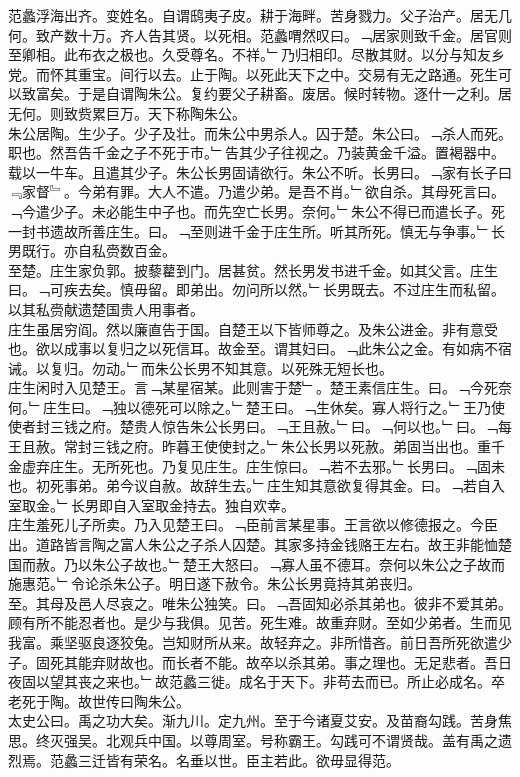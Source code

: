 \documentclass{zhvt-classic}
\begin{document}
\hspace*{2em}范蠡浮海出齐。变姓名。自谓鸱夷子皮。耕于海畔。苦身戮力。父子治产。居无几何。致产数十万。齐人告其贤。以死相。范蠡喟然叹曰。﹁居家则致千金。居官则至卿相。此布衣之极也。久受尊名。不祥。﹂乃归相印。尽散其财。以分与知友乡党。而怀其重宝。间行以去。止于陶。以死此天下之中。交易有无之路通。死生可以致富矣。于是自谓陶朱公。复约要父子耕畜。废居。候时转物。逐什一之利。居无何。则致赀累巨万。天下称陶朱公。\\
\hspace*{2em}朱公居陶。生少子。少子及壮。而朱公中男杀人。囚于楚。朱公曰。﹁杀人而死。职也。然吾告千金之子不死于市。﹂告其少子往视之。乃装黄金千溢。置褐器中。载以一牛车。且遣其少子。朱公长男固请欲行。朱公不听。长男曰。﹁家有长子曰﹃家督﹄。今弟有罪。大人不遣。乃遣少弟。是吾不肖。﹂欲自杀。其母死言曰。﹁今遣少子。未必能生中子也。而先空亡长男。奈何。﹂朱公不得已而遣长子。死一封书遗故所善庄生。曰。﹁至则进千金于庄生所。听其所死。慎无与争事。﹂长男既行。亦自私赍数百金。\\
\hspace*{2em}至楚。庄生家负郭。披藜藋到门。居甚贫。然长男发书进千金。如其父言。庄生曰。﹁可疾去矣。慎毋留。即弟出。勿问所以然。﹂长男既去。不过庄生而私留。以其私赍献遗楚国贵人用事者。\\
\hspace*{2em}庄生虽居穷阎。然以廉直告于国。自楚王以下皆师尊之。及朱公进金。非有意受也。欲以成事以复归之以死信耳。故金至。谓其妇曰。﹁此朱公之金。有如病不宿诫。以复归。勿动。﹂而朱公长男不知其意。以死殊无短长也。\\
\hspace*{2em}庄生闲时入见楚王。言﹁某星宿某。此则害于楚﹂。楚王素信庄生。曰。﹁今死奈何。﹂庄生曰。﹁独以德死可以除之。﹂楚王曰。﹁生休矣。寡人将行之。﹂王乃使使者封三钱之府。楚贵人惊告朱公长男曰。﹁王且赦。﹂曰。﹁何以也。﹂曰。﹁每王且赦。常封三钱之府。昨暮王使使封之。﹂朱公长男以死赦。弟固当出也。重千金虚弃庄生。无所死也。乃复见庄生。庄生惊曰。﹁若不去邪。﹂长男曰。﹁固未也。初死事弟。弟今议自赦。故辞生去。﹂庄生知其意欲复得其金。曰。﹁若自入室取金。﹂长男即自入室取金持去。独自欢幸。\\
\hspace*{2em}庄生羞死儿子所卖。乃入见楚王曰。﹁臣前言某星事。王言欲以修德报之。今臣出。道路皆言陶之富人朱公之子杀人囚楚。其家多持金钱赂王左右。故王非能恤楚国而赦。乃以朱公子故也。﹂楚王大怒曰。﹁寡人虽不德耳。奈何以朱公之子故而施惠范。﹂令论杀朱公子。明日遂下赦令。朱公长男竟持其弟丧归。\\
\hspace*{2em}至。其母及邑人尽哀之。唯朱公独笑。曰。﹁吾固知必杀其弟也。彼非不爱其弟。顾有所不能忍者也。是少与我俱。见苦。死生难。故重弃财。至如少弟者。生而见我富。乘坚驱良逐狡兔。岂知财所从来。故轻弃之。非所惜吝。前日吾所死欲遣少子。固死其能弃财故也。而长者不能。故卒以杀其弟。事之理也。无足悲者。吾日夜固以望其丧之来也。﹂故范蠡三徙。成名于天下。非苟去而已。所止必成名。卒老死于陶。故世传曰陶朱公。\\
\hspace*{2em}太史公曰。禹之功大矣。渐九川。定九州。至于今诸夏艾安。及苗裔勾践。苦身焦思。终灭强吴。北观兵中国。以尊周室。号称霸王。勾践可不谓贤哉。盖有禹之遗烈焉。范蠡三迁皆有荣名。名垂以世。臣主若此。欲毋显得范。\\
\end{document}
